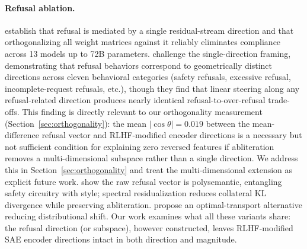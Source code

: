 \documentclass[11pt,letterpaper]{article}
\begin{document}
\paragraph{Refusal ablation.}
\citet{Arditi2024} establish that refusal is mediated by a single residual-stream direction and that
orthogonalizing all weight matrices against it reliably eliminates compliance across 13 models up to
72B parameters. \citet{Joad2026} challenge the single-direction framing, demonstrating that refusal
behaviors correspond to geometrically distinct directions across eleven behavioral categories (safety
refusals, excessive refusal, incomplete-request refusals, etc.), though they find that linear steering
along any refusal-related direction produces nearly identical refusal-to-over-refusal trade-offs. This
finding is directly relevant to our orthogonality measurement (Section~\ref{sec:orthogonality}): the
mean $|\cos\theta| = 0.019$ between the mean-difference refusal vector and RLHF-modified encoder
directions is a necessary but not sufficient condition for explaining zero reversed features if
abliteration removes a multi-dimensional subspace rather than a single direction. We address this in
Section~\ref{sec:orthogonality} and treat the multi-dimensional extension as explicit future work.
\citet{Cristofano2026} show the raw refusal vector is polysemantic, entangling safety circuitry with
style; spectral residualization reduces collateral KL divergence while preserving abliteration.
\citet{Nanfack2026} propose an optimal-transport alternative reducing distributional shift. Our work
examines what all these variants share: the refusal direction (or subspace), however constructed,
leaves RLHF-modified SAE encoder directions intact in both direction and magnitude.
\end{document}
